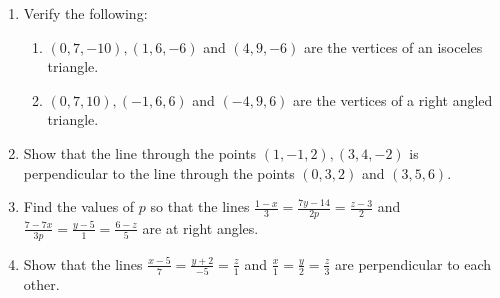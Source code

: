 \begin{enumerate}[label=\thesubsection.\arabic*, ref=\thesubsection.\theenumi]
\item Verify the following:
\begin{enumerate}
\item $(0, 7, -10),  (1, 6, -6)$ and $(4, 9, -6)$ are the vertices of an isoceles triangle.
\item $(0, 7, 10),  (-1, 6, 6)$ and $(-4, 9, 6)$ are the vertices of a right angled triangle.
\end{enumerate}
\item  Show that the line through the points $(1, -1, 2), (3, 4, -2 )$ is perpendicular to the line through the points $(0, 3, 2)$ and $(3, 5, 6)$.
\item Find the values of $p$ so that the lines $ \frac{1-x}{3}=\frac{7y-14}{2p}=\frac{z-3}{2}$ and $ \frac{7-7x}{3p}=\frac{y-5}{1}=\frac{6-z}{5}$ are at right angles.
\item Show that the lines $ \frac{x-5}{7}=\frac{y+2}{-5}=\frac{z}{1}$ and $ \frac{x}{1}=\frac{y}{2}=\frac{z}{3}$ are perpendicular to each other.
\end{enumerate}

